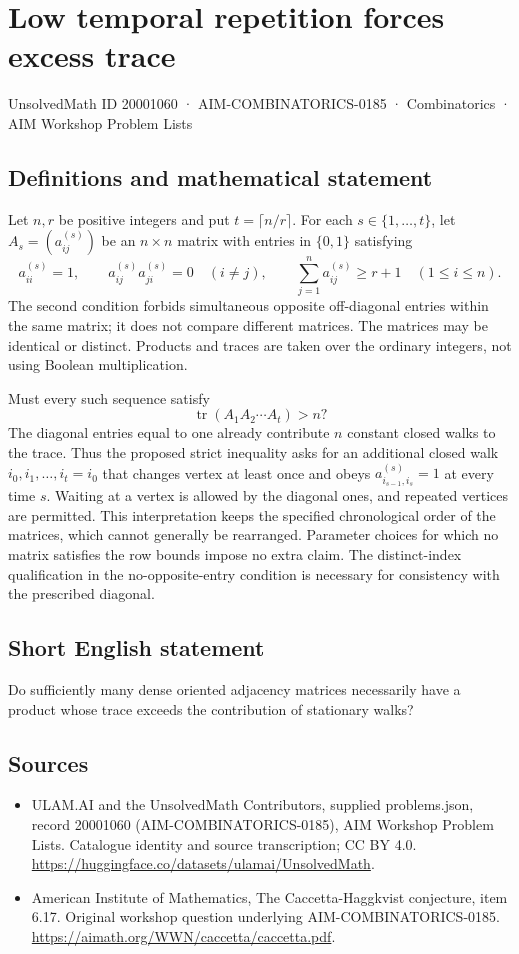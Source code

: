 \documentclass[11pt,a4paper]{article}
\begin{document}
\section*{Low temporal repetition forces excess trace}\label{20001060}
{\small UnsolvedMath ID 20001060 · AIM-COMBINATORICS-0185 · Combinatorics · AIM Workshop Problem Lists}
\subsection{Definitions and mathematical statement}
Let $n,r$ be positive integers and put $t=\lceil n/r\rceil$.
For each $s\in\{1,\ldots,t\}$, let $A_s=(a^{(s)}_{ij})$ be an $n\times n$ matrix with entries in $\{0,1\}$ satisfying
\[
 a^{(s)}_{ii}=1,\qquad
 a^{(s)}_{ij}a^{(s)}_{ji}=0\quad(i\ne j),\qquad
 \sum_{j=1}^n a^{(s)}_{ij}\geq r+1\quad(1\leq i\leq n).
\]
The second condition forbids simultaneous opposite off-diagonal entries within the same matrix; it does not compare different matrices.
The matrices may be identical or distinct.
Products and traces are taken over the ordinary integers, not using Boolean multiplication.

Must every such sequence satisfy
\[
 \operatorname{tr}(A_1A_2\cdots A_t)>n?
\]
The diagonal entries equal to one already contribute $n$ constant closed walks to the trace.
Thus the proposed strict inequality asks for an additional closed walk
$i_0,i_1,\ldots,i_t=i_0$ that changes vertex at least once and obeys
$a^{(s)}_{i_{s-1},i_s}=1$ at every time $s$.
Waiting at a vertex is allowed by the diagonal ones, and repeated vertices are permitted.
This interpretation keeps the specified chronological order of the matrices, which cannot generally be rearranged.
Parameter choices for which no matrix satisfies the row bounds impose no extra claim.
The distinct-index qualification in the no-opposite-entry condition is necessary for consistency with the prescribed diagonal.
\subsection{Short English statement}
Do sufficiently many dense oriented adjacency matrices necessarily have a product whose trace exceeds the contribution of stationary walks?
\subsection{Sources}
\begin{itemize}
\item[S1] ULAM.AI and the UnsolvedMath Contributors, supplied problems.json, record 20001060 (AIM-COMBINATORICS-0185), AIM Workshop Problem Lists. Catalogue identity and source transcription; CC BY 4.0.
\url{https://huggingface.co/datasets/ulamai/UnsolvedMath}.
\item[S2] American Institute of Mathematics, The Caccetta-Haggkvist conjecture, item 6.17. Original workshop question underlying AIM-COMBINATORICS-0185.
\url{https://aimath.org/WWN/caccetta/caccetta.pdf}.
\end{itemize}
\end{document}
